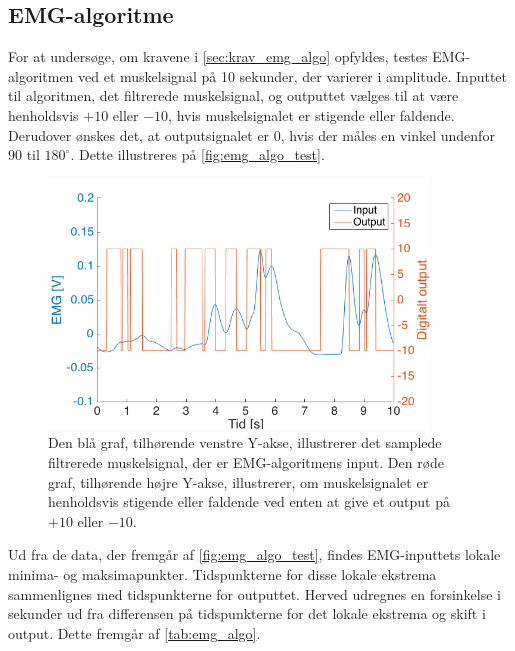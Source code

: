 \subsection{EMG-algoritme}
For at undersøge, om kravene i \autoref{sec:krav_emg_algo} opfyldes, testes EMG-algoritmen ved et muskelsignal på 10 sekunder, der varierer i amplitude. 
Inputtet til algoritmen, det filtrerede muskelsignal, og outputtet vælges til at være henholdsvis $+10$ eller $-10$, hvis muskelsignalet er stigende eller faldende. 
Derudover ønskes det, at outputsignalet er 0, hvis der måles en vinkel undenfor $90$ til $180^{\circ}$. 
Dette illustreres på \autoref{fig:emg_algo_test}. 

\begin{figure}[H]
\centering
\includegraphics[width=0.9\textwidth]{figures/EMG_algo_test}
\caption{Den blå graf, tilhørende venstre Y-akse, illustrerer det samplede filtrerede muskelsignal, der er EMG-algoritmens input. Den røde graf, tilhørende højre Y-akse, illustrerer, om muskelsignalet er henholdsvis stigende eller faldende ved enten at give et output på $+10$ eller $-10$.}
\label{fig:emg_algo_test}
\end{figure}

\noindent
Ud fra de data, der fremgår af \autoref{fig:emg_algo_test}, findes EMG-inputtets lokale minima- og maksimapunkter. 
Tidspunkterne for disse lokale ekstrema sammenlignes med tidspunkterne for outputtet.  Herved udregnes en forsinkelse i sekunder ud fra differensen på tidspunkterne for det lokale ekstrema og skift i output. 
Dette fremgår af \autoref{tab:emg_algo}. 

